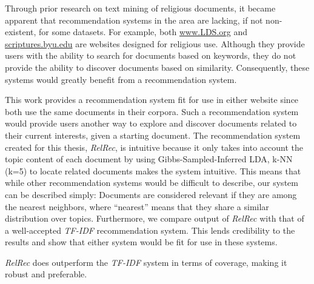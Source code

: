 
Through prior research on text mining of religious documents, it became apparent that recommendation systems in the area are lacking, if not non-existent, for some datasets. For example, both \url{www.LDS.org} and \url{scriptures.byu.edu} are websites designed for religious use. Although they provide users with the ability to search for documents based on keywords, they do not provide the ability to discover documents based on similarity. Consequently, these systems would greatly benefit from a recommendation system.

This work provides a recommendation system fit for use in either website since both use the same documents in their corpora. Such a recommendation system would provide users another way to explore and discover documents related to their current interests, given a starting document. The recommendation system created for this thesis, \emph{RelRec}, is intuitive because it only takes into account the topic content of each document by using Gibbs-Sampled-Inferred LDA, k-NN (k=5) to locate related documents makes the system intuitive. This means that while other recommendation systems would be difficult to describe, our system can be described simply: Documents are considered relevant if they are among the nearest neighbors, where ``nearest'' means that they share a similar distribution over topics. Furthermore, we compare output of \emph{RelRec} with that of a well-accepted \emph{TF-IDF} recommendation system. This lends credibility to the results and show that either system would be fit for use in these systems.

\emph{RelRec} does outperform the \emph{TF-IDF} system in terms of coverage, making it robust and preferable. %
